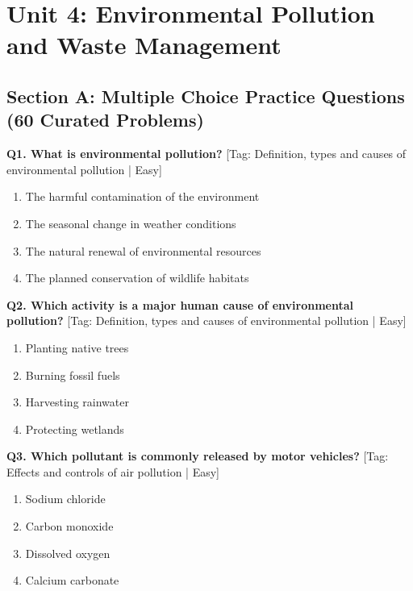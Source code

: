 \chapter{Unit 4: Environmental Pollution and Waste Management}

\section{Section A: Multiple Choice Practice Questions (60 Curated Problems)}

\noindent\textbf{Q1. What is environmental pollution?} \hfill [Tag: Definition, types and causes of environmental pollution | Easy]
\begin{enumerate}[label=(\alph*),topsep=2pt,itemsep=1pt,partopsep=0pt,parsep=0pt]
    \item {The harmful contamination of the environment}
    \item {The seasonal change in weather conditions}
    \item {The natural renewal of environmental resources}
    \item {The planned conservation of wildlife habitats}
\end{enumerate}
\vspace{2mm}

\noindent\textbf{Q2. Which activity is a major human cause of environmental pollution?} \hfill [Tag: Definition, types and causes of environmental pollution | Easy]
\begin{enumerate}[label=(\alph*),topsep=2pt,itemsep=1pt,partopsep=0pt,parsep=0pt]
    \item {Planting native trees}
    \item {Burning fossil fuels}
    \item {Harvesting rainwater}
    \item {Protecting wetlands}
\end{enumerate}
\vspace{2mm}

\noindent\textbf{Q3. Which pollutant is commonly released by motor vehicles?} \hfill [Tag: Effects and controls of air pollution | Easy]
\begin{enumerate}[label=(\alph*),topsep=2pt,itemsep=1pt,partopsep=0pt,parsep=0pt]
    \item {Sodium chloride}
    \item {Carbon monoxide}
    \item {Dissolved oxygen}
    \item {Calcium carbonate}
\end{enumerate}
\vspace{2mm}

